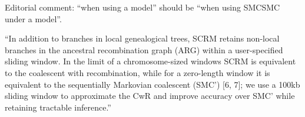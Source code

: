 \documentclass{article}
\begin{document}
Editorial comment: ``when using a model'' should be ``when using
SMCSMC under a model''.

``In addition to branches in local genealogical trees, SCRM retains
non-local branches in the ancestral recombination graph (ARG) within a
user-specified sliding window. In the limit of a chromosome-sized
windows SCRM is equivalent to the coalescent with recombination, while
for a zero-length window it is equivalent to the sequentially
Markovian coalescent (SMC’) [6, 7]; we use a 100kb sliding window to
approximate the CwR and improve accuracy over SMC’ while retaining
tractable inference.''
\end{document}
